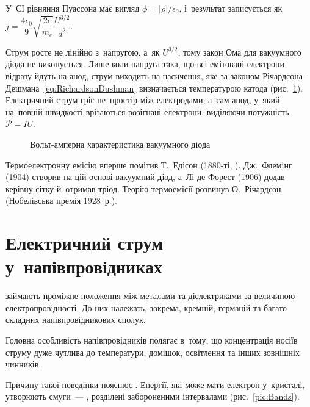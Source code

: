 У~СІ рівняння Пуассона має вигляд $\phi=|\rho|/\epsilon_0$, і~результат записується як
$j=\dfrac{4\epsilon_0}{9}\sqrt{\dfrac{2e}{m_e}}\dfrac{U^{3/2}}{d^2}$.

Струм росте не лінійно з~напругою, а~як $U^{3/2}$, тому закон Ома для вакуумного діода не
виконується. Лише коли напруга така, що всі емітовані електрони відразу йдуть на анод,
струм виходить на насичення, яке за законом
Річардсона-Дешмана~\eqref{eq:RichardsonDushman} визначається температурою катода
(рис.~\ref{pic:VacuumDiodeIV}). Електричний струм гріє не~простір між електродами, а~сам
анод, у~який на~повній швидкості врізаються розігнані електрони, виділяючи потужність
$\mathcal{P} = IU$.

\begin{figure}[h!]\centering
	\caption{Вольт-амперна характеристика вакуумного діода\label{pic:VacuumDiodeIV}}
\end{figure}

\begin{Historical}
	Термоелектронну емісію вперше помітив Т.~Едісон (1880-ті, ).
	Дж.~Флемінг (1904) створив на цій основі вакуумний діод, а~Лі де Форест (1906) додав
	керівну сітку й~отримав тріод. Теорію термоемісії розвинув О.~Річардсон (Нобелівська
	премія 1928~р.).
\end{Historical}


\section{Електричний струм у~напівпровідниках}\label{sec:CurrentInSemiconductors}\hypertarget{current-in-semiconductors}{}


 займають проміжне положення між металами та діелектриками за
величиною електропровідності. До них належать, зокрема, кремній, германій та багато
складних напівпровідникових сполук.

Головна особливість напівпровідників полягає в~тому, що концентрація носіїв струму дуже
чутлива до температури, домішок, освітлення та інших зовнішніх чинників.

Причину такої поведінки пояснює . Енергії, які може мати електрон
у~кристалі, утворюють смуги~--- , розділені забороненими інтервалами
(рис.~\ref{pic:Bands}).

